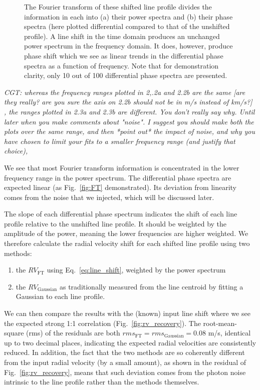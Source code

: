 \begin{figure}[tbp]
    \caption[Fourier transform of 100 shifted line profiles]{The Fourier transform of these shifted line 				profile divides the information in each into (a) their power spectra and (b) their phase spectra (here	 			plotted differential compared to that 	of the unshifted profile). A line shift in the time domain 				produces an unchanged power spectrum in the frequency domain. It does, however, produce phase shift which 			we see as linear trends in the differential phase spectra as a function of frequency. Note that for 				demonstration clarity, only 10 out of 100 differential phase spectra are presented.}
\label{fig:FT_process}
\end{figure}    

{\em CGT: whereas the frequency ranges plotted in 2,.2a and 2.2b are the same [are they really? are you sure the axis on 2.2b should not be in m/s instead of km/s?]
, the ranges plotted in 2.3a and 2.3b are different. You don't really say why. Until later when you make comments about "noise".
I suggest you should make both the plots over the same range, and then *point out* the impact of noise,
and why you have chosen to limit your fits to a smaller frequency range (and justify that choice),}

We see that most Fourier transform information is concentrated in the lower frequency range in the power spectrum.
The differential phase spectra are expected linear (as Fig.~\ref{fig:FT} demonstrated). Its deviation from linearity 
comes from the noise that we injected, which will be discussed later. 

The slope of each differential phase spectrum indicates the shift of each line profile relative to 
the unshifted line profile. It should be weighted by the amplitude of the power, meaning the lower frequencies 
are higher weighted. We therefore calculate the radial velocity shift for each shifted line profile
using two methods: 
\begin{enumerate}
	\item the $RV_\text{FT}$ using Eq.~\ref{eq:line_shift}, weighted by the power spectrum
	\item the $RV_\text{Gaussian}$ as traditionally measured from the line centroid by fitting a Gaussian to each line profile.
\end{enumerate}
We can then compare the results with the (known) input line shift where we see the expected strong 1:1 correlation (Fig.~\ref{fig:rv_recovery}). The root-mean-square (rms) of the residuals are both $rms_\text{FT} = rms_\text{Gaussian} = 0.08$ m/s, identical up to two decimal places, indicating the expected radial velocities are consistently reduced. In addition, the fact that the two methods are so coherently different from the input radial velocity (by a small amount), as shown in the residual of Fig.~\ref{fig:rv_recovery}, means that such deviation comes from the photon noise intrinsic to the line profile rather than the methods themselves. 

